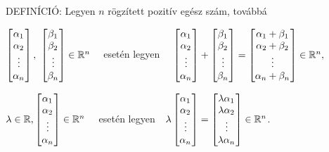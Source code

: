 \documentclass[a4paper,11.5pt]{article}
\begin{document}
	\pagebreak
	 DEFINÍCIÓ: { Legyen} $n$ { rögzített pozitív
		egész szám, továbbá}
	
	{\centering 
		$\begin{bmatrix}
		\alpha_{1}\s \\
		\alpha_{2}\s \\
		\vdots\\
		\alpha_{n}\s \\
		\end{bmatrix},~
		\begin{bmatrix}
		\beta_{1}\s \\
		\beta_{2}\s \\
		\vdots\\
		\beta_{n}\s \\
		\end{bmatrix} \in\Rn\quad$ {esetén legyen}
		$\quad
		\begin{bmatrix}
		\alpha_{1}\s \\
		\alpha_{2}\s \\
		\vdots\\
		\alpha_{n}\s \\
		\end{bmatrix} +
		\begin{bmatrix}
		\beta_{1}\s \\
		\beta_{2}\s \\
		\vdots\\
		\beta_{n}\s \\
		\end{bmatrix} =
		\begin{bmatrix}
		\alpha_{1}+\beta_{1}\s \\
		\alpha_{2}+\beta_{2}\s \\
		\vdots\\
		\alpha_{n}+\beta_{n}\s \\
		\end{bmatrix} \in \Rn, $
		
		$\lambda \in  \R,
		\begin{bmatrix}
		\alpha_{1}\s \\
		\alpha_{2}\s \\
		\vdots\\
		\alpha_{n}\s \\
		\end{bmatrix} \in  \Rn\quad$ {esetén legyen}$\quad
		\lambda
		\begin{bmatrix}
		\alpha_{1}\s \\
		\alpha_{2}\s \\
		\vdots\\
		\alpha_{n}\s \\
		\end{bmatrix} =
		\begin{bmatrix}
		\lambda\alpha_{1}\s \\
		\lambda\alpha_{2}\s \\
		\vdots\\
		\lambda\alpha_{n}\s \\
		\end{bmatrix} \in  \Rn$. 
		\par}
	
\end{document}
